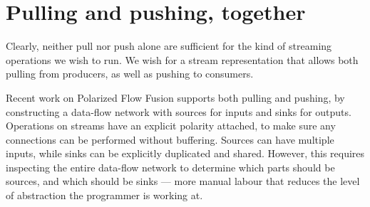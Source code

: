 \section{Pulling and pushing, together}

Clearly, neither pull nor push alone are sufficient for the kind of streaming operations we wish to run.
We wish for a stream representation that allows both pulling from producers, as well as pushing to consumers. 

Recent work on Polarized Flow Fusion \citep{lippmeier2016polarized} supports both pulling and pushing, by constructing a data-flow network with sources for inputs and sinks for outputs.
Operations on streams have an explicit polarity attached, to make sure any connections can be performed without buffering.
Sources can have multiple inputs, while sinks can be explicitly duplicated and shared.
However, this requires inspecting the entire data-flow network to determine which parts should be sources, and which should be sinks --- more manual labour that reduces the level of abstraction the programmer is working at.


